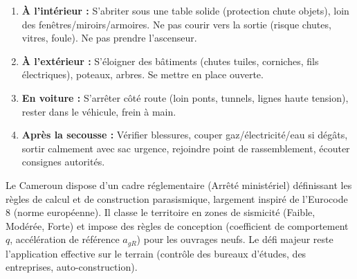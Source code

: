 \documentclass[11pt]{article}
\begin{document}
\begin{methode}
\begin{enumerate}
    \item \textbf{À l'intérieur :} S'abriter sous une table solide (protection chute objets), loin des fenêtres/miroirs/armoires. Ne pas courir vers la sortie (risque chutes, vitres, foule). Ne pas prendre l'ascenseur.
    \item \textbf{À l'extérieur :} S'éloigner des bâtiments (chutes tuiles, corniches, fils électriques), poteaux, arbres. Se mettre en place ouverte.
    \item \textbf{En voiture :} S'arrêter côté route (loin ponts, tunnels, lignes haute tension), rester dans le véhicule, frein à main.
    \item \textbf{Après la secousse :} Vérifier blessures, couper gaz/électricité/eau si dégâts, sortir calmement avec sac urgence, rejoindre point de rassemblement, écouter consignes autorités.
\end{enumerate}
\end{methode}

\begin{exemplebox}
Le Cameroun dispose d'un cadre réglementaire (Arrêté ministériel) définissant les règles de calcul et de construction parasismique, largement inspiré de l'Eurocode 8 (norme européenne). Il classe le territoire en zones de sismicité (Faible, Modérée, Forte) et impose des règles de conception (coefficient de comportement $q$, accélération de référence $a_{gR}$) pour les ouvrages neufs. Le défi majeur reste l'application effective sur le terrain (contrôle des bureaux d'études, des entreprises, auto-construction).
\end{exemplebox}
\end{document}

